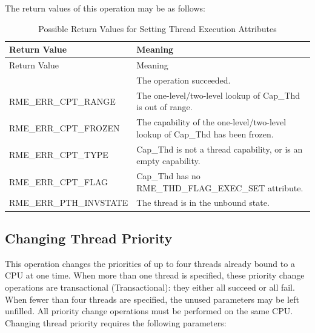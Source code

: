 The return values of this operation may be as follows:

\begin{xltabular}{\textwidth}{@{}>{\hsize\raggedright\arraybackslash}X>{\hsize\raggedright\arraybackslash}X@{}}
\caption{Possible Return Values for Setting Thread Execution Attributes}\label{tab:4-29-set-thread-execution-attributes-return-values}\\
\toprule
Return Value & Meaning\tabularnewline
\endfirsthead
\toprule
Return Value & Meaning\tabularnewline
\midrule
\endhead
\bottomrule
{} & The operation succeeded.\tabularnewline
    RME\_ERR\_CPT\_RANGE & The one-level/two-level lookup of Cap\_Thd is out of range.\tabularnewline
    RME\_ERR\_CPT\_FROZEN & The capability of the one-level/two-level lookup of Cap\_Thd has been frozen.\tabularnewline
    RME\_ERR\_CPT\_TYPE & Cap\_Thd is not a thread capability, or is an empty capability.\tabularnewline
    RME\_ERR\_CPT\_FLAG & Cap\_Thd has no RME\_THD\_FLAG\_EXEC\_SET attribute.\tabularnewline
    RME\_ERR\_PTH\_INVSTATE & The thread is in the unbound state.\tabularnewline
\end{xltabular}
\nopagebreak[4]

\subsection{Changing Thread Priority}\label{subsec:4-change-thread-priority}

This operation changes the priorities of up to four threads already bound to a CPU at one time. When more than one thread is specified, these priority change operations are transactional (Transactional): they either all succeed or all fail. When fewer than four threads are specified, the unused parameters may be left unfilled. All priority change operations must be performed on the same CPU. Changing thread priority requires the following parameters:


